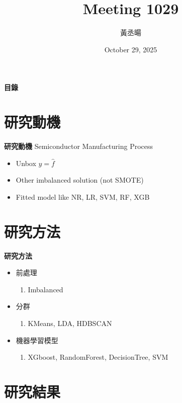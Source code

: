 \documentclass[12pt,aspectratio=43]{beamer}
\title{Meeting 1029}
\author{黃丞暘}
\institute{國立東華大學應數統計所}
\date{October 29, 2025}
\begin{document}
\begin{frame}
  \titlepage
\end{frame}

\begin{frame}{\textbf{目錄}}
  \tableofcontents
\end{frame}

\section{研究動機}

\begin{frame}{\textbf{研究動機}}
\linespread{1.5}
  Semiconductor Manufacturing Process
  \begin{itemize}
    \item Unbox $y=\hat{f}$
    \item Other imbalanced solution (not SMOTE)
    \item Fitted model like NR, LR, SVM, RF, XGB
  \end{itemize}
\end{frame}

\section{研究方法}
\begin{frame}{\textbf{研究方法}}
\linespread{1.5}
  \begin{itemize}[]
    \item 前處理
      \begin{enumerate}[]
        \item Imbalanced
      \end{enumerate}
    \item 分群
      \begin{enumerate}[]
        \item KMeans, LDA, HDBSCAN
      \end{enumerate}
    \item 機器學習模型
      \begin{enumerate}[]
        \item XGboost, RandomForest, DecisionTree, SVM
      \end{enumerate}
  \end{itemize}
\end{frame}

\section{研究結果}
\end{document}
